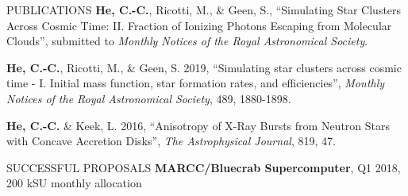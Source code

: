 \documentclass[letterpaper]{resume} %
\begin{document}

\begin{rSection}{PUBLICATIONS} \itemsep -3pt
  {\bf He, C.-C.}, Ricotti, M., \& Geen, S., ``Simulating Star Clusters Across Cosmic Time: II. Fraction of Ionizing Photons Escaping from Molecular Clouds'', submitted to {\it Monthly Notices of the Royal Astronomical Society}.
  \item {\bf He, C.-C.}, Ricotti, M., \& Geen, S. 2019, ``Simulating star clusters across cosmic time - I. Initial mass function, star formation rates, and efficiencies'', {\it Monthly Notices of the Royal Astronomical Society}, 489, 1880-1898.
  \item {\bf He, C.-C.} \& Keek, L. 2016, ``Anisotropy of X-Ray Bursts from Neutron Stars with Concave Accretion Disks'', {\it The Astrophysical Journal}, 819, 47.
\end{rSection}


\begin{rSection}{SUCCESSFUL PROPOSALS}
{\bf MARCC/Bluecrab Supercomputer}, Q1 2018, 200 kSU monthly allocation
\end{rSection}

\end{document}
